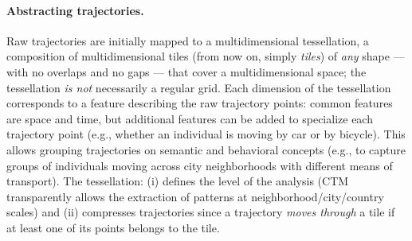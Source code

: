 \documentclass[
]{ceurart}
\begin{document}
\paragraph{Abstracting trajectories.}
Raw trajectories are initially mapped to a multidimensional tessellation, a composition of multidimensional tiles (from now on, simply \textit{tiles}) of \textit{any} shape --- with no overlaps and no gaps --- that cover a multidimensional space; the tessellation \textit{is not} necessarily a regular grid.
Each dimension of the tessellation corresponds to a feature describing the raw trajectory points: common features are space and time, but additional features can be added to specialize each trajectory point (e.g., whether an individual is moving by car or by bicycle).
This allows grouping trajectories on semantic and behavioral concepts (e.g., to capture groups of individuals moving across city neighborhoods with different means of transport).
The tessellation:
(i) defines the level of the analysis (CTM transparently allows the extraction of patterns at neighborhood/city/country scales) 
and (ii) compresses trajectories since a trajectory \textit{moves through} a tile if at least one of its points belongs to the tile.
\end{document}
